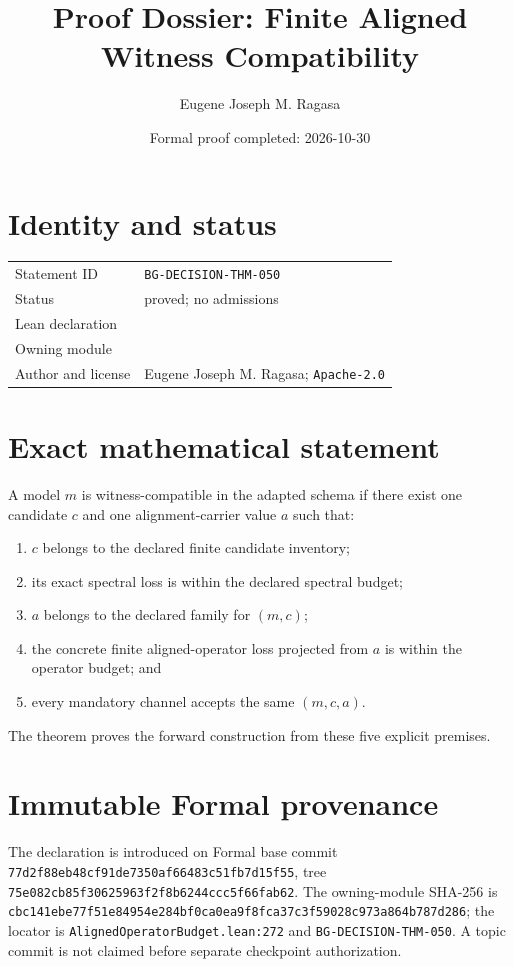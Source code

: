 \documentclass[11pt]{article}
\title{Proof Dossier: Finite Aligned Witness Compatibility}
\author{Eugene Joseph M. Ragasa}
\date{Formal proof completed: 2026-10-30}
\begin{document}
\raggedright
\maketitle

\section{Identity and status}
\begin{tabularx}{\textwidth}{@{}lY@{}}
\toprule
Statement ID & \texttt{BG-DECISION-THM-050} \\
Status & proved; no admissions \\
Lean declaration &  \\
Owning module &  \\
Author and license & Eugene Joseph M. Ragasa; \texttt{Apache-2.0} \\
\bottomrule
\end{tabularx}

\section{Exact mathematical statement}
A model $m$ is witness-compatible in the adapted schema if there exist one candidate $c$ and one alignment-carrier value $a$ such that:
\begin{enumerate}
\item $c$ belongs to the declared finite candidate inventory;
\item its exact spectral loss is within the declared spectral budget;
\item $a$ belongs to the declared family for $(m,c)$;
\item the concrete finite aligned-operator loss projected from $a$ is within the operator budget; and
\item every mandatory channel accepts the same $(m,c,a)$.
\end{enumerate}
The theorem proves the forward construction from these five explicit premises.

\section{Immutable Formal provenance}
The declaration is introduced on Formal base commit
\texttt{77d2f88eb48cf91de7350af66483c51fb7d15f55}, tree
\texttt{75e082cb85f30625963f2f8b6244ccc5f66fab62}.  The owning-module SHA-256 is
\texttt{cbc141ebe77f51e84954e284bf0ca0ea9f8fca37c3f59028c973a864b787d286}; the locator is \texttt{AlignedOperatorBudget.lean:272} and \texttt{BG-DECISION-THM-050}.  A topic commit is not claimed before separate checkpoint authorization.
\end{document}
